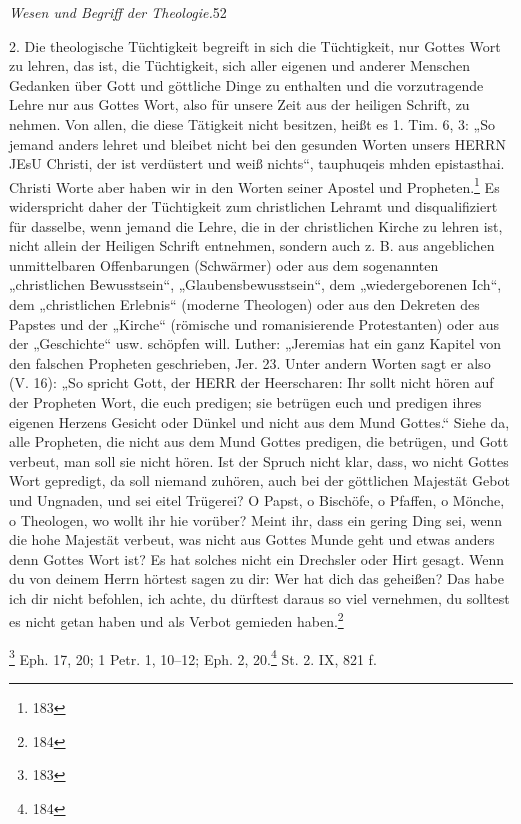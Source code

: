 \begin{center}\textit{Wesen und Begriff der Theologie.}\hfill 52\end{center}\vspace{1em}

2. Die theologische Tüchtigkeit begreift in sich die Tüchtigkeit, nur Gottes Wort zu lehren, das ist, die Tüchtigkeit, sich aller eigenen und anderer Menschen Gedanken über Gott und göttliche Dinge zu enthalten und die vorzutragende Lehre nur aus Gottes Wort, also für unsere Zeit aus der heiligen Schrift, zu nehmen. Von allen, die diese Tätigkeit nicht besitzen, heißt es 1. Tim. 6, 3: „So jemand anders lehret und bleibet nicht bei den gesunden Worten unsers HERRN JEsU Christi, der ist verdüstert und weiß nichts“, \greektext tauphuqeis mhden epistasthai\greektext . Christi Worte aber haben wir in den Worten seiner Apostel und Propheten.\footnote{183} Es widerspricht daher der Tüchtigkeit zum christlichen Lehramt und disqualifiziert für dasselbe, wenn jemand die Lehre, die in der christlichen Kirche zu lehren ist, nicht allein der Heiligen Schrift entnehmen, sondern auch z. B. aus angeblichen unmittelbaren Offenbarungen (Schwärmer) oder aus dem sogenannten „christlichen Bewusstsein“, „Glaubensbewusstsein“, dem „wiedergeborenen Ich“, dem „christlichen Erlebnis“ (moderne Theologen) oder aus den Dekreten des Papstes und der „Kirche“ (römische und romanisierende Protestanten) oder aus der „Geschichte“ usw. schöpfen will. Luther: „Jeremias hat ein ganz Kapitel von den falschen Propheten geschrieben, Jer. 23. Unter andern Worten sagt er also (V. 16): „So spricht Gott, der HERR der Heerscharen: Ihr sollt nicht hören auf der Propheten Wort, die euch predigen; sie betrügen euch und predigen ihres eigenen Herzens Gesicht oder Dünkel und nicht aus dem Mund Gottes.“ Siehe da, alle Propheten, die nicht aus dem Mund Gottes predigen, die betrügen, und Gott verbeut, man soll sie nicht hören. Ist der Spruch nicht klar, dass, wo nicht Gottes Wort gepredigt, da soll niemand zuhören, auch bei der göttlichen Majestät Gebot und Ungnaden, und sei eitel Trügerei? O Papst, o Bischöfe, o Pfaffen, o Mönche, o Theologen, wo wollt ihr hie vorüber? Meint ihr, dass ein gering Ding sei, wenn die hohe Majestät verbeut, was nicht aus Gottes Munde geht und etwas anders denn Gottes Wort ist? Es hat solches nicht ein Drechsler oder Hirt gesagt. Wenn du von deinem Herrn hörtest sagen zu dir: Wer hat dich das geheißen? Das habe ich dir nicht befohlen, ich achte, du dürftest daraus so viel vernehmen, du solltest es nicht getan haben und als Verbot gemieden haben.\footnote{184}

\begingroup\renewcommand{}
\footnote{183} Eph. 17, 20; 1 Petr. 1, 10–12; Eph. 2, 20.\footnote{184} St. 2. IX, 821 f.\endgroup
